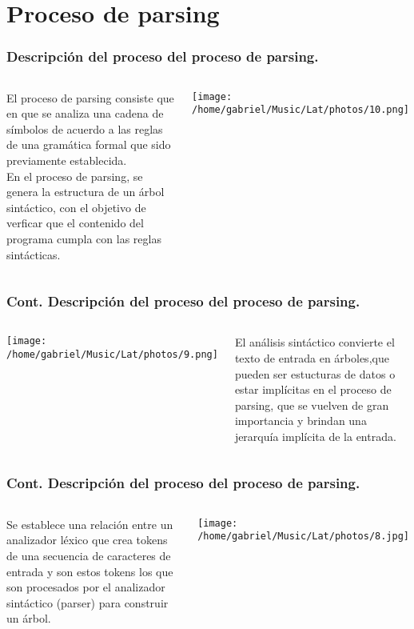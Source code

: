 \documentclass{beamer}
\begin{document}
\section{Proceso de parsing}

\begin{frame}
\frametitle{Descripción del proceso del proceso de parsing.}
\begin{columns}

El proceso de parsing consiste que en que se analiza una cadena de símbolos de acuerdo
a las reglas de una gramática formal que sido previamente establecida.\\
En el proceso de parsing, se genera la estructura de un árbol sintáctico, con el objetivo de verficar 
que el contenido del programa cumpla con las reglas sintácticas.


\begin{center}
    \texttt{[image: /home/gabriel/Music/Lat/photos/10.png]}
\end{center}

\end{columns}

\end{frame}

\begin{frame}
\frametitle{Cont. Descripción del proceso del proceso de parsing.}
\begin{columns}


\begin{center}
    \texttt{[image: /home/gabriel/Music/Lat/photos/9.png]}
\end{center}


El análisis sintáctico convierte el texto de entrada en árboles,que pueden ser estucturas de datos o estar implícitas en el proceso de parsing, que se vuelven de gran importancia y brindan una jerarquía implícita de la entrada. 


\end{columns}

\end{frame}

\begin{frame}
\frametitle{Cont. Descripción del proceso del proceso de parsing.}
\begin{columns}


Se establece una relación entre un analizador léxico que crea tokens de una secuencia de caracteres de entrada y son estos tokens los que son procesados por el analizador sintáctico (parser) para construir un árbol.


\begin{center}
    \texttt{[image: /home/gabriel/Music/Lat/photos/8.jpg]}
\end{center}


\end{columns}

\end{frame}
\end{document}

